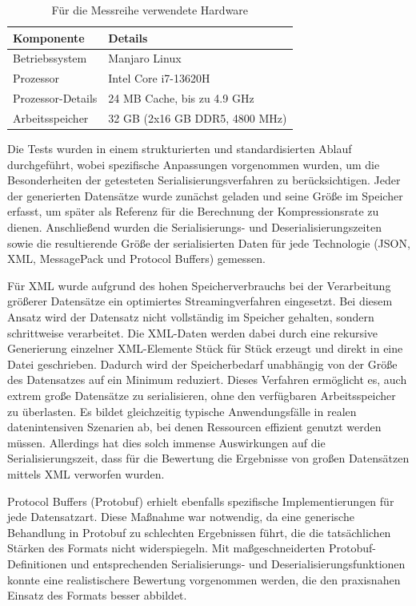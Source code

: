 \documentclass[ngerman]{seminarvorlage}
\begin{document}
\begin{table}[H]
\centering
\begin{tabular}{|l|l|}
\hline
\textbf{Komponente}         & \textbf{Details}                     \\ \hline
Betriebssystem              & Manjaro Linux                        \\ \hline
Prozessor                   & Intel Core i7-13620H                 \\ \hline
Prozessor-Details           & 24 MB Cache, bis zu 4.9 GHz           \\ \hline
Arbeitsspeicher             & 32 GB (2x16 GB DDR5, 4800 MHz)       \\ \hline
\end{tabular}
\caption{Für die Messreihe verwendete Hardware}
\label{tab:hardware}
\end{table}

Die Tests wurden in einem strukturierten und standardisierten Ablauf durchgeführt, wobei spezifische Anpassungen vorgenommen wurden, um die Besonderheiten der getesteten Serialisierungsverfahren zu berücksichtigen. Jeder der generierten Datensätze wurde zunächst geladen und seine Größe im Speicher erfasst, um später als Referenz für die Berechnung der Kompressionsrate zu dienen. Anschließend wurden die Serialisierungs- und Deserialisierungszeiten sowie die resultierende Größe der serialisierten Daten für jede Technologie (JSON, XML, MessagePack und Protocol Buffers) gemessen.

Für XML wurde aufgrund des hohen Speicherverbrauchs bei der Verarbeitung größerer Datensätze ein optimiertes Streamingverfahren eingesetzt. Bei diesem Ansatz wird der Datensatz nicht vollständig im Speicher gehalten, sondern schrittweise verarbeitet. Die XML-Daten werden dabei durch eine rekursive Generierung einzelner XML-Elemente Stück für Stück erzeugt und direkt in eine Datei geschrieben. Dadurch wird der Speicherbedarf unabhängig von der Größe des Datensatzes auf ein Minimum reduziert. Dieses Verfahren ermöglicht es, auch extrem große Datensätze zu serialisieren, ohne den verfügbaren Arbeitsspeicher zu überlasten. Es bildet gleichzeitig typische Anwendungsfälle in realen datenintensiven Szenarien ab, bei denen Ressourcen effizient genutzt werden müssen. Allerdings hat dies solch immense Auswirkungen auf die Serialisierungszeit, dass für die Bewertung die Ergebnisse von großen Datensätzen mittels XML verworfen wurden.

Protocol Buffers (Protobuf) erhielt ebenfalls spezifische Implementierungen für jede Datensatzart. Diese Maßnahme war notwendig, da eine generische Behandlung in Protobuf zu schlechten Ergebnissen führt, die die tatsächlichen Stärken des Formats nicht widerspiegeln. Mit maßgeschneiderten Protobuf-Definitionen und entsprechenden Serialisierungs- und Deserialisierungsfunktionen konnte eine realistischere Bewertung vorgenommen werden, die den praxisnahen Einsatz des Formats besser abbildet.
\end{document}
